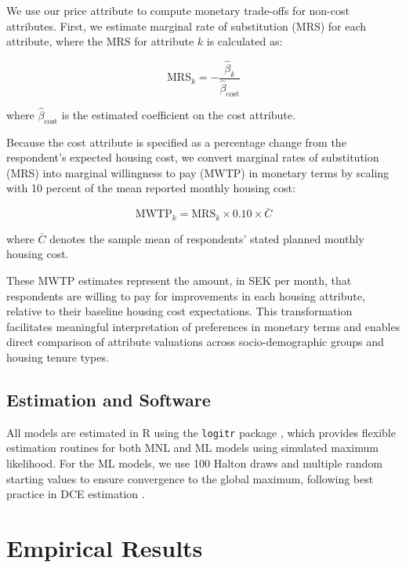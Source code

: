 \documentclass[3p,11pt ]{elsarticle}
\begin{document}
We use our price attribute to compute monetary trade-offs for non-cost attributes. 
First,
we estimate marginal rate of substitution (MRS) for each attribute,
where the MRS for attribute \( k \) is calculated as:

\begin{equation}
\text{MRS}_k = -\frac{\hat{\beta}_k}{\hat{\beta}_{\text{cost}}}
\end{equation}

\noindent where \( \hat{\beta}_{\text{cost}} \) is the estimated coefficient on the cost attribute.

Because the cost attribute is specified as a percentage change from the respondent’s expected housing cost, we convert marginal rates of substitution (MRS) into marginal willingness to pay (MWTP) in monetary terms by scaling with 10 percent of the mean reported monthly housing cost:

\begin{equation}
\text{MWTP}_k = \text{MRS}_k \times 0.10 \times \bar{C}
\end{equation}

\noindent where $\bar{C}$ denotes the sample mean of respondents' stated planned monthly housing cost.

These MWTP estimates represent the amount, in SEK per month, that respondents are willing to pay for improvements in each housing attribute, relative to their baseline housing cost expectations. This transformation facilitates meaningful interpretation of preferences in monetary terms and enables direct comparison of attribute valuations across socio-demographic groups and housing tenure types.

\subsection{Estimation and Software}

All models are estimated in R using the \texttt{logitr} package \citep{helvestonLogitrFastEstimation2023}, which provides flexible estimation routines for both MNL and ML models using simulated maximum likelihood.
For the ML models,
we use 100 Halton draws and multiple random starting values to ensure convergence to the global maximum, following best practice in DCE estimation \citep{trainDiscreteChoiceMethods2003}.




\section{Empirical Results}
\end{document}
